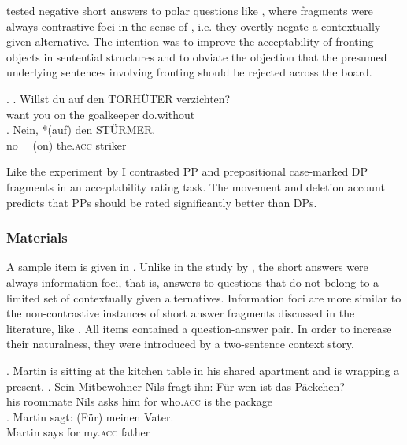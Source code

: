 \citet{merchant.etal2013} tested negative short answers to polar questions like \Next \citep[34]{merchant.etal2013}, where fragments were always contrastive foci in the sense of \citet{krifka2007}, i.e. they overtly negate a contextually given alternative. The intention was to improve the acceptability of fronting objects in sentential structures and to obviate the objection that the presumed underlying sentences involving fronting should be rejected across the board.

\ex. \ag. Willst du  auf den TORHÜTER verzichten?\\
want you on the goalkeeper do.without\\
\bg. Nein,  *(auf) den STÜRMER.\\
no \mbox{~~}(on) the.\textsc{acc} striker\\
\hfill 

Like the experiment by \citet{merchant.etal2013} I contrasted PP and prepositional case-marked DP fragments in an acceptability rating task. The movement and deletion account predicts that PPs should be rated significantly better than DPs.

\subsubsection{Materials}
\label{sec:pstranding-german-materials}
A sample item is given in \Next. Unlike in the study by \citet{merchant.etal2013}, the short answers were always information foci, that is, answers to questions that do not belong to a limited set of contextually given alternatives. Information foci are more similar to the non-contrastive instances of short answer fragments discussed in the literature, like \LLast. All items contained a question-answer pair. In order to increase their naturalness, they were introduced by a two-sentence context story.

\ex. Martin is sitting at the kitchen table in his shared apartment and is wrapping a present. \label{ex:pstranding-ger-omission-ex}
\ag. Sein Mitbewohner Nils fragt ihn: Für wen ist das Päckchen?\\
     his roommate Nils asks him for who.\textsc{acc} is the package\\
\bg. Martin sagt: (Für) meinen Vater.\\
     Martin says for my.\textsc{acc} father\\
     
